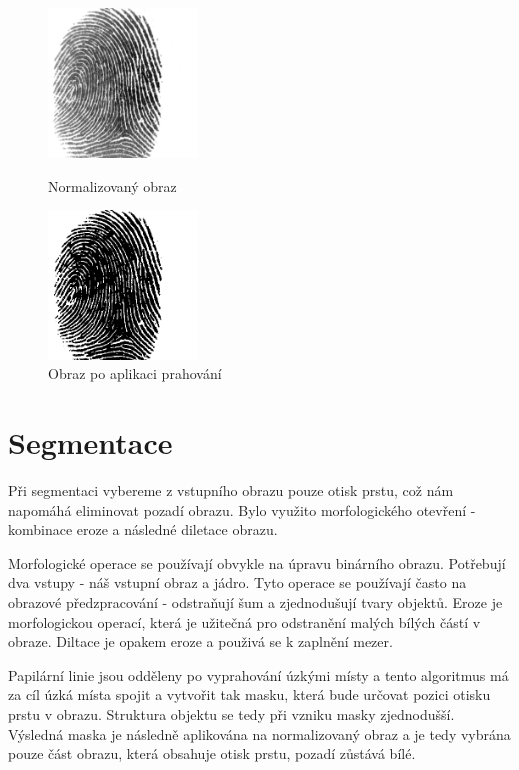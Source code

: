 \begin{figure}[htbp]
  \begin{minipage}[b]{0.5\linewidth}
    \centering
    \includegraphics[width=150px]{obrazky-figures/104_7norm.png}
    \caption{Normalizovaný obraz}
  \end{minipage}
  \hspace{0.5cm}
  \begin{minipage}[b]{0.5\linewidth}
    \centering
    \includegraphics[width=150px]{obrazky-figures/tresh104.png}
    \caption{Obraz po aplikaci prahování}
  \end{minipage}
\end{figure}
\section{Segmentace}
Při segmentaci vybereme z vstupního obrazu pouze otisk prstu, což nám napomáhá eliminovat pozadí obrazu. Bylo využito morfologického otevření - kombinace eroze a následné diletace obrazu.

Morfologické operace se používají obvykle na úpravu binárního obrazu. Potřebují dva vstupy - náš vstupní obraz a jádro.\cite{OpenCVMorphology} Tyto operace se používají často na obrazové předzpracování - odstraňují šum a zjednodušují tvary objektů. Eroze je morfologickou operací, která je užitečná pro odstranění malých bílých částí v obraze. Diltace je opakem eroze a použivá se k zaplnění mezer.\cite{ExerciseMorphology}

Papilární linie jsou odděleny po vyprahování úzkými místy a tento algoritmus má za cíl úzká místa spojit a vytvořit tak masku, která bude určovat pozici otisku prstu v obrazu. Struktura objektu se tedy při vzniku masky zjednodušší. Výsledná maska je následně aplikována na normalizovaný obraz a je tedy vybrána pouze část obrazu, která obsahuje otisk prstu, pozadí zůstává bílé.

